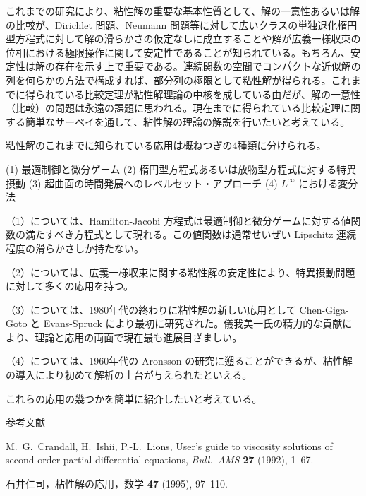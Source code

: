 \documentclass[uplatex,dvipdfmx]{jlreq}
\begin{document}
これまでの研究により、粘性解の重要な基本性質として、解の一意性あるいは解の比較が、Dirichlet 問題、Neumann 問題等に対して広いクラスの単独退化楕円型方程式に対して解の滑らかさの仮定なしに成立することや解が広義一様収束の位相における極限操作に関して安定性であることが知られている。もちろん、安定性は解の存在を示す上で重要である。連続関数の空間でコンパクトな近似解の列を何らかの方法で構成すれば、部分列の極限として粘性解が得られる。これまでに得られている比較定理が粘性解理論の中核を成している由だが、解の一意性（比較）の問題は永遠の課題に思われる。現在までに得られている比較定理に関する簡単なサーベイを通して、粘性解の理論の解説を行いたいと考えている。

粘性解のこれまでに知られている応用は概ねつぎの4種類に分けられる。

(1) 最適制御と微分ゲーム  
(2) 楕円型方程式あるいは放物型方程式に対する特異摂動  
(3) 超曲面の時間発展へのレベルセット・アプローチ  
(4) $L^\infty$ における変分法  

（1）については、Hamilton-Jacobi 方程式は最適制御と微分ゲームに対する値関数の満たすべき方程式として現れる。この値関数は通常せいぜい Lipschitz 連続程度の滑らかさしか持たない。

（2）については、広義一様収束に関する粘性解の安定性により、特異摂動問題に対して多くの応用を持つ。

（3）については、1980年代の終わりに粘性解の新しい応用として Chen-Giga-Goto と Evans-Spruck により最初に研究された。儀我美一氏の精力的な貢献により、理論と応用の両面で現在最も進展目ざましい。

（4）については、1960年代の Aronsson の研究に遡ることができるが、粘性解の導入により初めて解析の土台が与えられたといえる。

これらの応用の幾つかを簡単に紹介したいと考えている。

\bigskip

\begin{center}\textsc{参考文献}\end{center}

\begin{enumerate}[{[1]}]
  \item M.~G.~Crandall, H.~Ishii, P.-L.~Lions,
        User's guide to viscosity solutions of second order partial differential equations,
        \textit{Bull.\ AMS} \textbf{27} (1992), 1--67.
  \item 石井仁司，粘性解の応用，数学 \textbf{47} (1995), 97--110.
\end{enumerate}

\newpage
\end{document}
